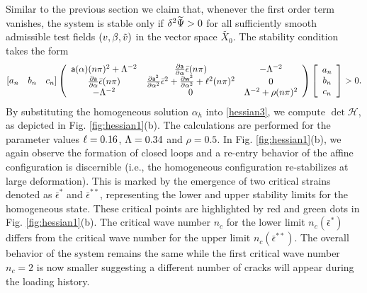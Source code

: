 Similar to the previous section we claim that, whenever the first order term vanishes, the system is stable only if $\delta^2 \widetilde\Psi
>0$ for all sufficiently smooth admissible test fields $(v, \beta, \tilde v)$ in the vector space $\widetilde{ X_0}$. The stability condition  takes the form
\begin{align}
    \left[ a_n \quad b_n \quad c_n \right]\left(
\begin{array}{ccc}
\mathsf{a}(\alpha)(n\pi)^2+\Lambda^{-2}& \frac{\partial \mathsf{a}}{\partial \alpha}\bar\epsilon(n\pi) &  -\Lambda^{-2} \\
\frac{\partial \mathsf{a}}{\partial \alpha}\bar\epsilon(n\pi) & \frac{\partial \mathsf{a}^2}{\partial \alpha^2}\bar\epsilon^2+ \frac{\partial \mathsf{w}^2}{\partial \alpha^2}+\ell^2(n\pi)^2 & 0 \\
 -\Lambda^{-2} & 0 & \Lambda^{-2} +\rho (n\pi)^2\\
\end{array}
\right)\left[ \begin{array}{c} a_n \\ b_n \\c_n \end{array} \right]>0.\label{hessian3}\end{align}
By substituting the homogeneous solution $\alpha_h$ into \eqref{hessian3}, we compute $\det \mathcal{H}$, as depicted  in Fig. \ref{fig:hessian1}(b). The calculations are performed for the parameter values $\ell=0.16$, $\Lambda=0.34$ and $\rho=0.5$.  In Fig. \ref{fig:hessian1}(b), we again observe the formation of closed loops and a re-entry behavior of the affine configuration is discernible  (i.e., the homogeneous configuration re-stabilizes at large deformation). This is marked by the emergence of two critical strains denoted as $\bar\epsilon^*$ and $\bar\epsilon^{**}$, representing the lower and upper stability limits for the homogeneous state. These critical points are highlighted by red and green dots in Fig. \ref{fig:hessian1}(b). The critical wave number $n_c$ for the lower limit $n_c(\bar{\epsilon}^*)$    differs from the critical wave number for the upper limit $n_c(\bar{\epsilon}^{**})$. The overall behavior of the system remains the same while the first critical wave number $n_c=2$ is now smaller suggesting a different number of cracks will appear during the loading history.




